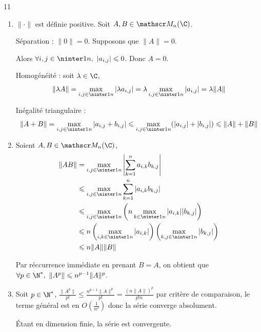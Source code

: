 \begin{correction}{11}
\begin{enumerate}
    \item $\|\cdot\|$ est définie positive.
    Soit $A,B \in \mathscr M_n(\C)$.

    Séparation : $\|0\| = 0$. Supposons que $\|A\| = 0$.

    Alors $\forall i,j \in \ninter 1 n,~|a_{i,j}| \leqslant 0$. Donc $A = 0$.
    
    Homogénéité : soit $\lambda \in \C$,
    \[\|\lambda A\| = \max_{i,j \in \ninter 1 n} |\lambda a_{i,j}| = \lambda \max_{i,j \in \ninter 1 n} |a_{i,j}| = \lambda \|A\|\]

    Inégalité triangulaire :
    \[\|A + B\| = \max_{i,j \in \ninter 1 n} |a_{i,j} + b_{i,j}| \leqslant \max_{i,j \in \ninter 1 n} (|a_{i,j}| + |b_{i,j}|) \leqslant \|A\| + \|B\|\]

    \item Soient $A,B \in \mathscr M_n(\C)$,
    \begin{align*}
        \|AB\| &= \max_{i,j \in \ninter 1 n} \left|\sum_{k=1}^n a_{i,k} b_{k,j}\right| \\
               &\leqslant \max_{i,j \in \ninter 1 n} \sum_{k=1}^n |a_{i,k} b_{k,j}| \\
               &\leqslant \max_{i,j \in \ninter 1 n}\left(n \max_{k \in \ninter 1 n} |a_{i,k}| |b_{k,j}|\right) \\
               &\leqslant n \left(\max_{i,k \in \ninter 1 n} |a_{i,k}|\right) \left(\max_{k,j \in \ninter 1 n} |b_{k,j}|\right) \\
               &\leqslant n \|A\| \|B\|
    \end{align*}

    Par réccurrence immédiate en prenant $B = A$, on obtient que $\forall p \in \N^*,~\|A^p\| \leqslant n^{p-1}\|A\|^p$.

    \item Soit $p \in \N^*$,
    $\frac {\|A^p\|} {p!} \leqslant \frac {n^{p-1}\|A\|^p} {p!} = \frac {(n\|A\|)^p} {p!n}$
    par critère de comparaison, le terme général est en $O\left(\frac 1 {n^2}\right)$ donc la série converge absolument.

    Étant en dimension finie, la série est convergente.
\end{enumerate}
\end{correction}

